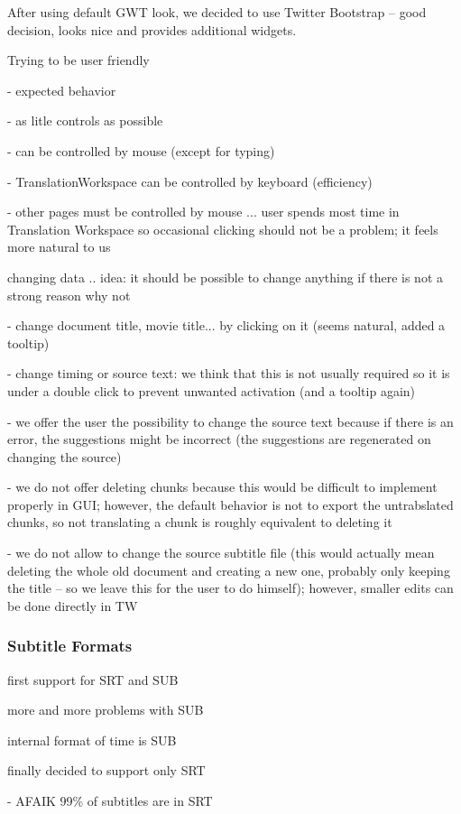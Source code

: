 After using default GWT look, we decided to use Twitter Bootstrap -- good decision, looks nice and provides additional widgets.

Trying to be user friendly

- expected behavior

- as litle controls as possible

- can be controlled by mouse (except for typing)

- TranslationWorkspace can be controlled by keyboard (efficiency)

- other pages must be controlled by mouse ... user spends most time in Translation Workspace so occasional clicking should not be a problem; it feels more natural to us

changing data .. idea: it should be possible to change anything if there is not a strong reason why not

- change document title, movie title... by clicking on it (seems natural, added a tooltip)

- change timing or source text: we think that this is not usually required so it is under a double click to prevent unwanted activation (and a tooltip again)

- we offer the user the possibility to change the source text because if there is an error, the suggestions might be incorrect (the suggestions are regenerated on changing the source)

- we do not offer deleting chunks because this would be difficult to implement properly in GUI; however, the default behavior is not to export the untrabslated chunks, so not translating a chunk is roughly equivalent to deleting it

- we do not allow to change the source subtitle file (this would actually mean deleting the whole old document and creating a new one, probably only keeping the title -- so we leave this for the user to do himself); however, smaller edits can be done directly in TW

\subsubsection{Subtitle Formats}

first support for SRT and SUB

more and more problems with SUB

internal format of time is SUB

finally decided to support only SRT

- AFAIK 99\% of subtitles are in SRT

